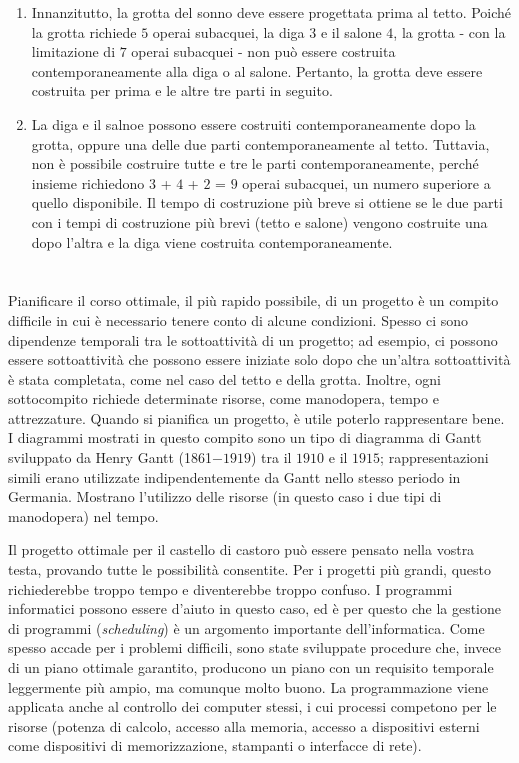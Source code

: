 {{\begin{enumerate}
  \item Innanzitutto, la grotta del sonno deve essere progettata prima al tetto. Poiché la grotta richiede $5$ operai subacquei, la diga $3$ e il salone $4$, la grotta - con la limitazione di $7$ operai subacquei - non può essere costruita contemporaneamente alla diga o al salone. Pertanto, la grotta deve essere costruita per prima e le altre tre parti in seguito.
  \item La diga e il salnoe possono essere costruiti contemporaneamente dopo la grotta, oppure una delle due parti contemporaneamente al tetto. Tuttavia, non è possibile costruire tutte e tre le parti contemporaneamente, perché insieme richiedono $3$ + $4$ + $2$ = $9$ operai subacquei, un numero superiore a quello disponibile. Il tempo di costruzione più breve si ottiene se le due parti con i tempi di costruzione più brevi (tetto e salone) vengono costruite una dopo l’altra e la diga viene costruita contemporaneamente.
\end{enumerate}



\section*{\BrochureItsInformatics}
Pianificare il corso ottimale, il più rapido possibile, di un progetto è un compito difficile in cui è necessario tenere conto di alcune condizioni. Spesso ci sono dipendenze temporali tra le sottoattività di un progetto; ad esempio, ci possono essere sottoattività che possono essere iniziate solo dopo che un’altra sottoattività è stata completata, come nel caso del tetto e della grotta. Inoltre, ogni sottocompito richiede determinate risorse, come manodopera, tempo e attrezzature. Quando si pianifica un progetto, è utile poterlo rappresentare bene. I diagrammi mostrati in questo compito sono un tipo di diagramma di Gantt sviluppato da Henry Gantt (1861$-1919$) tra il $1910$ e il $1915$; rappresentazioni simili erano utilizzate indipendentemente da Gantt nello stesso periodo in Germania. Mostrano l’utilizzo delle risorse (in questo caso i due tipi di manodopera) nel tempo.

Il progetto ottimale per il castello di castoro può essere pensato nella vostra testa, provando tutte le possibilità consentite. Per i progetti più grandi, questo richiederebbe troppo tempo e diventerebbe troppo confuso. I programmi informatici possono essere d’aiuto in questo caso, ed è per questo che la gestione di programmi (\emph{scheduling}) è un argomento importante dell’informatica. Come spesso accade per i problemi difficili, sono state sviluppate procedure che, invece di un piano ottimale garantito, producono un piano con un requisito temporale leggermente più ampio, ma comunque molto buono. La programmazione viene applicata anche al controllo dei computer stessi, i cui processi competono per le risorse (potenza di calcolo, accesso alla memoria, accesso a dispositivi esterni come dispositivi di memorizzazione, stampanti o interfacce di rete).



}}

